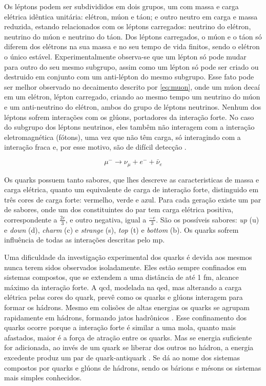 Os léptons podem ser subdivididos em dois grupos, 
um com massa e carga elétrica idêntica unitária: elétron, múon e táon; 
e outro neutro em carga e massa reduzida, estando relacionados com os léptons
carregados: neutrino do elétron, neutrino do múon e neutrino do táon. Dos
léptons carregados, o múon e o táon só diferem dos elétrons na sua massa e no
seu tempo de vida finitos, sendo o elétron o único estável.
Experimentalmente observa-se que um lépton só pode mudar para outro do seu mesmo
subgrupo, assim como um lépton só pode ser criado ou destruido em conjunto com
um anti-lépton do mesmo subgrupo. Esse fato pode ser melhor observado no
decaimento descrito por \ref{eq:muon}, onde um múon decaí em um
elétron, lépton carregado, criando ao mesmo tempo um neutrino do múon e um
anti-neutrino do elétron, ambos do grupo de léptons neutrinos.
Nenhum dos léptons sofrem interações com os glúons, portadores da interação forte.
No caso do subgrupo dos léptons neutrinos, eles tambêm não interagem com a
interação eletromagnética (fótons), 
uma vez que não têm carga, só interagindo com a interação fraca e, por esse motivo,
são de difícil detecção \cite{Intro_Nuclear,Intro_Standard}.

\begin{equation} \label{eq:muon}
\mu^{-} \rightarrow \nu_{\mu} + e^- + \bar{\nu}_{e}
\end{equation}

Os quarks possuem tanto sabores, que lhes descreve as caracteristicas de massa e
carga elétrica, quanto um equivalente de carga de interação
forte, distinguido em três cores de carga forte: vermelho, verde e azul. 
Para cada geração existe um par de sabores, onde um dos constituintes do par tem
carga elétrica positiva, correspondente a $\frac{2e}{3}$,
e outro negativa, igual a $\frac{-e}{3}$. São os possíveis sabores: \emph{up}
(u) e \emph{down} (d), \emph{charm} (c) e \emph{strange} (s), \emph{top} (t) e
\emph{bottom} (b). Os quarks sofrem influência de todas as interações descritas
pelo \gls{mp}.


Uma dificuldade da investigação experimental dos quarks é devida aos mesmos
nunca terem sidos observados isoladamente. Eles estão sempre confinados em sistemas
compostos, que se extendem a uma distância de até 1 fm, alcance máximo da interação forte. 
A \gls{qcd}, modelada na \gls{qed}, mas alterando a carga elétrica pelas cores do quark, 
prevê como os quarks e glúons interagem para formar os hádrons. Mesmo
em colisões de altas energias os quarks se agrupam rapidamente em hádrons,
formando jatos hadrônicos \cite{Intro_Nuclear}. Esse confinamento dos quarks ocorre 
porque a interação forte é similar a uma mola, quanto mais afastados, maior é a
força de atração entre os quarks. Mas se energia suficiente for adicionada,
ao invés de um quark se liberar dos outros no hádron, a energia excedente produz
um par de quark-antiquark \cite{Beiser}.
Se dá ao nome dos sistemas compostos por quarks e glúons de
hádrons, sendo os bárions e mésons os sistemas mais simples conhecidos. 

